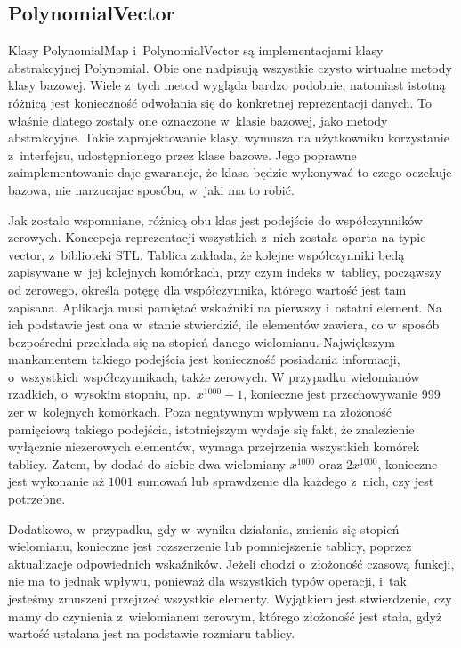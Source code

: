 \subsection{PolynomialVector}

Klasy PolynomialMap i~PolynomialVector są implementacjami klasy abstrakcyjnej Polynomial. Obie one nadpisują wszystkie czysto wirtualne metody klasy bazowej. Wiele z~tych metod wygląda bardzo podobnie, natomiast istotną różnicą jest konieczność odwołania się do konkretnej reprezentacji danych. To właśnie dlatego zostały one oznaczone w~klasie bazowej, jako metody abstrakcyjne. Takie zaprojektowanie klasy, wymusza na użytkowniku korzystanie z~interfejsu, udostępnionego przez klase bazowe. Jego poprawne zaimplementowanie daje gwarancje, że klasa będzie wykonywać to czego oczekuje bazowa, nie narzucajac sposóbu, w~jaki ma to robić.

Jak zostało wspomniane, różnicą obu klas jest podejście do współczynników zerowych. Koncepcja reprezentacji wszystkich z~nich została oparta na typie vector, z~biblioteki STL. Tablica zakłada, że kolejne współczynniki bedą zapisywane w~jej kolejnych komórkach, przy czym indeks w~tablicy, począwszy od zerowego, określa potęgę dla współczynnika, którego wartość jest tam zapisana. Aplikacja musi pamiętać wskaźniki na pierwszy i~ostatni element. Na ich podstawie jest ona w~stanie stwierdzić, ile elementów zawiera, co w~sposób bezpośredni przekłada się na stopień danego wielomianu. Największym mankamentem takiego podejścia jest konieczność posiadania informacji, o~wszystkich współczynnikach, także zerowych. W przypadku wielomianów rzadkich, o~wysokim stopniu, np.\ $x^{1000}-1$, konieczne jest przechowywanie 999 zer w~kolejnych komórkach. Poza negatywnym wpływem na złożoność pamięciową takiego podejścia, istotniejszym wydaje się fakt, że znalezienie wyłącznie niezerowych elementów, wymaga przejrzenia wszystkich komórek tablicy. Zatem, by dodać do siebie dwa wielomiany $x^{1000}$ oraz $2x^{1000}$, konieczne jest wykonanie aż $1001$ sumowań lub sprawdzenie dla każdego z~nich, czy jest potrzebne.

Dodatkowo, w~przypadku, gdy w~wyniku działania, zmienia się stopień wielomianu, konieczne jest rozszerzenie lub pomniejszenie tablicy, poprzez aktualizacje odpowiednich wskaźników. Jeżeli chodzi o~złożoność czasową funkcji, nie ma to jednak wpływu, ponieważ dla wszystkich typów operacji, i~tak jesteśmy zmuszeni przejrzeć wszystkie elementy. Wyjątkiem jest stwierdzenie, czy mamy do czynienia z~wielomianem zerowym, którego złożoność jest stała, gdyż wartość ustalana jest na podstawie rozmiaru tablicy.

